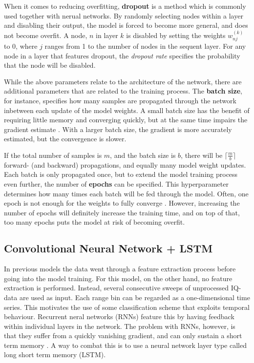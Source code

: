 When it comes to reducing overfitting, \textbf{dropout} is a method which is commonly used together with nerual networks. By randomly selecting nodes within a layer and disabling their output, the model is forced to become more general, and does not become overfit. A node, $n$ in layer $k$ is disabled by setting the weights $w^{(k)}_{nj}$ to 0, where $j$ ranges from 1 to the number of nodes in the sequent layer. For any node in a layer that features dropout, the \textit{dropout rate} specifies the probability that the node will be disabled.

While the above parameters relate to the architecture of the network, there are additional parameters that are related to the training process. The \textbf{batch size}, for instance, specifies how many samples are propagated through the network inbetween each update of the model weights. A small batch size has the benefit of requiring little memory and converging quickly, but at the same time impairs the gradient estimate \citep{brownlee_2017}. With a larger batch size, the gradient is more accurately estimated, but the convergence is slower. 

If the total number of samples is $m$, and the batch size is $b$, there will be $\lceil \frac mb\rceil$ forward- (and backward) propagations, and equally many model weight updates. Each batch is only propagated once, but to extend the model training process even further, the number of \textbf{epochs} can be specified. This hyperparameter determines how many times each batch will be fed through the model. Often, one epoch is not enough for the weights to fully converge \citep{kriesel_2007}. However, increasing the number of epochs will definitely increase the training time, and on top of that, too many epochs puts the model at risk of becoming overfit.



\subsection*{Convolutional Neural Network + LSTM}
In previous models the data went through a feature extraction process before going into the model training. For this model, on the other hand, no feature extraction is performed. Instead, several consecutive sweeps of unprocessed IQ-data are used as input. Each range bin can be regarded as a one-dimensional time series. This motivates the use of some classification scheme that exploits temporal behaviour. Recurrent neral networks (RNNs) feature this by having feedback within individual layers in the network. \citep{karim_majumdar_darabi_chen_2018} The problem with RNNs, however, is that they suffer from a quickly vanishing gradient, and can only sustain a short term memory \citep{pascanu_mikolov_bengio_2013}. A way to combat this is to use a neural network layer type called long short term memory (LSTM).

